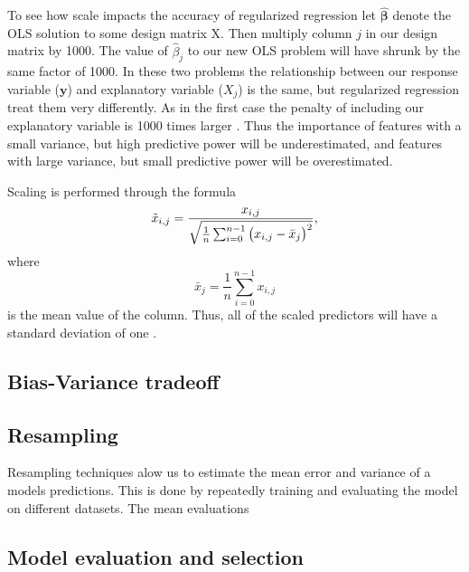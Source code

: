 \documentclass{article}
\begin{document}
To see how scale impacts the accuracy of regularized regression let $\boldsymbol{\hat{\beta}}$ denote the OLS solution to some design matrix X. Then multiply column $j$ in our design matrix by 1000. The value of $\hat{\beta}_j$ to our new OLS problem will have shrunk by the same factor of 1000. In these two problems the relationship between our response variable ($\boldsymbol{y}$) and explanatory variable ($X_j$) is the same, but regularized regression treat them very differently. As in the first case the penalty of including our explanatory variable is 1000 times larger \cite{james2021introduction}. Thus the importance of features with a small variance, but high predictive power will be underestimated, and features with large variance, but small predictive power will be overestimated.

Scaling is performed through the formula
\begin{equation*}
    \Tilde{x}_{i,j} = \frac{x_{i,j}}{\sqrt{\frac{1}{n} \sum_{i=0}^{n-1} \left( x_{i,j} - \Bar{x}_j \right)^2 }},
\end{equation*}
where 
\begin{equation*}
    \bar{x}_j = \frac{1}{n} \sum_{i=0}^{n-1} x_{i,j}
\end{equation*}
is the mean value of the column. Thus, all of the scaled predictors will have a standard deviation of one \cite{james2021introduction}.

\subsection{Bias-Variance tradeoff}

\subsection{Resampling}
Resampling techniques alow us to estimate the mean error and variance of a models predictions. This is done by repeatedly training and evaluating the model on different datasets. The mean  evaluations 



\subsection{Model evaluation and selection}


\newpage
\end{document}
